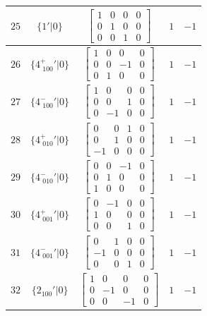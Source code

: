\documentclass[fleqn,8pt]{jsarticle}
\begin{document}
\begin{longtable}{ccccc}
$ 25 $ & $ \{1{}'|0\} $ & $ \begin{bmatrix} 1 & 0 & 0 & 0 \\ 0 & 1 & 0 & 0 \\ 0 & 0 & 1 & 0 \end{bmatrix} $ & $ 1 $ & $ -1 $ \\ \hline
$ 26 $ & $ \{4^{+}_{\,\,100}{}'|0\} $ & $ \begin{bmatrix} 1 & 0 & 0 & 0 \\ 0 & 0 & -1 & 0 \\ 0 & 1 & 0 & 0 \end{bmatrix} $ & $ 1 $ & $ -1 $ \\ \hline
$ 27 $ & $ \{4^{-}_{\,\,100}{}'|0\} $ & $ \begin{bmatrix} 1 & 0 & 0 & 0 \\ 0 & 0 & 1 & 0 \\ 0 & -1 & 0 & 0 \end{bmatrix} $ & $ 1 $ & $ -1 $ \\ \hline
$ 28 $ & $ \{4^{+}_{\,\,010}{}'|0\} $ & $ \begin{bmatrix} 0 & 0 & 1 & 0 \\ 0 & 1 & 0 & 0 \\ -1 & 0 & 0 & 0 \end{bmatrix} $ & $ 1 $ & $ -1 $ \\ \hline
$ 29 $ & $ \{4^{-}_{\,\,010}{}'|0\} $ & $ \begin{bmatrix} 0 & 0 & -1 & 0 \\ 0 & 1 & 0 & 0 \\ 1 & 0 & 0 & 0 \end{bmatrix} $ & $ 1 $ & $ -1 $ \\ \hline
$ 30 $ & $ \{4^{+}_{\,\,001}{}'|0\} $ & $ \begin{bmatrix} 0 & -1 & 0 & 0 \\ 1 & 0 & 0 & 0 \\ 0 & 0 & 1 & 0 \end{bmatrix} $ & $ 1 $ & $ -1 $ \\ \hline
$ 31 $ & $ \{4^{-}_{\,\,001}{}'|0\} $ & $ \begin{bmatrix} 0 & 1 & 0 & 0 \\ -1 & 0 & 0 & 0 \\ 0 & 0 & 1 & 0 \end{bmatrix} $ & $ 1 $ & $ -1 $ \\ \hline
$ 32 $ & $ \{2{}_{100}{}'|0\} $ & $ \begin{bmatrix} 1 & 0 & 0 & 0 \\ 0 & -1 & 0 & 0 \\ 0 & 0 & -1 & 0 \end{bmatrix} $ & $ 1 $ & $ -1 $ \\ \hline

\end{longtable}
\end{document}
